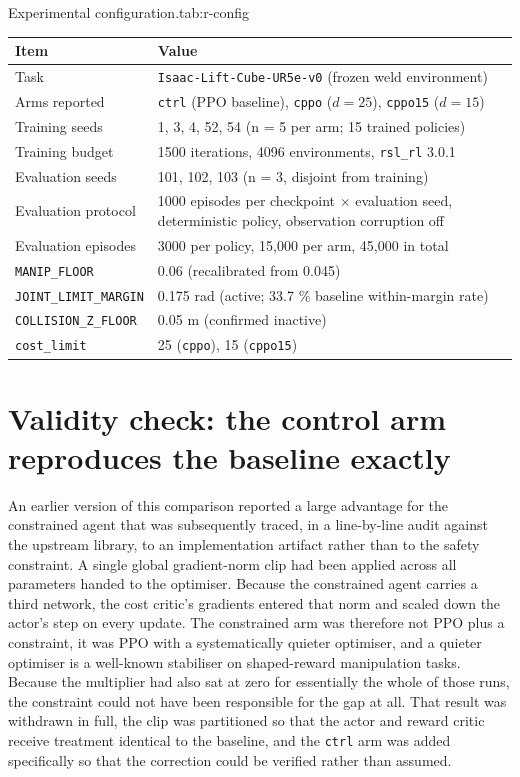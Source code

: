 \begin{kuettable}{Experimental configuration.}{tab:r-config}
\begin{tabular*}{\textwidth}{@{\extracolsep{\fill}}p{}p{}}
\toprule
Item & Value\\
\midrule
Task & \texttt{Isaac-Lift-Cube-UR5e-v0} (frozen weld environment)\\
Arms reported & \texttt{ctrl} (PPO baseline), \texttt{cppo} (\(d=25\)), \texttt{cppo15} (\(d=15\))\\
Training seeds & 1, 3, 4, 52, 54 (n = 5 per arm; 15 trained policies)\\
Training budget & 1500 iterations, 4096 environments, \texttt{rsl\_rl} 3.0.1\\
Evaluation seeds & 101, 102, 103 (n = 3, disjoint from training)\\
Evaluation protocol & 1000 episodes per checkpoint \(\times\) evaluation seed, deterministic policy, observation corruption off\\
Evaluation episodes & 3000 per policy, 15{,}000 per arm, 45{,}000 in total\\
\texttt{MANIP\_FLOOR} & 0.06 (recalibrated from 0.045)\\
\texttt{JOINT\_LIMIT\_MARGIN} & 0.175 rad (active; 33.7 \% baseline within-margin rate)\\
\texttt{COLLISION\_Z\_FLOOR} & 0.05 m (confirmed inactive)\\
\texttt{cost\_limit} & 25 (\texttt{cppo}), 15 (\texttt{cppo15})\\
\bottomrule
\end{tabular*}
\end{kuettable}

\section{Validity check: the control arm reproduces the baseline exactly}\label{sec:r-validity}

An earlier version of this comparison reported a large advantage for the constrained agent that
was subsequently traced, in a line-by-line audit against the upstream library, to an
implementation artifact rather than to the safety constraint. A single global gradient-norm clip
had been applied across all parameters handed to the optimiser. Because the constrained agent
carries a third network, the cost critic's gradients entered that norm and scaled down the
actor's step on every update. The constrained arm was therefore not PPO plus a constraint, it was
PPO with a systematically quieter optimiser, and a quieter optimiser is a well-known stabiliser
on shaped-reward manipulation tasks. Because the multiplier had also sat at zero for essentially
the whole of those runs, the constraint could not have been responsible for the gap at all. That
result was withdrawn in full, the clip was partitioned so that the actor and reward critic
receive treatment identical to the baseline, and the \texttt{ctrl} arm was added specifically so
that the correction could be verified rather than assumed.

